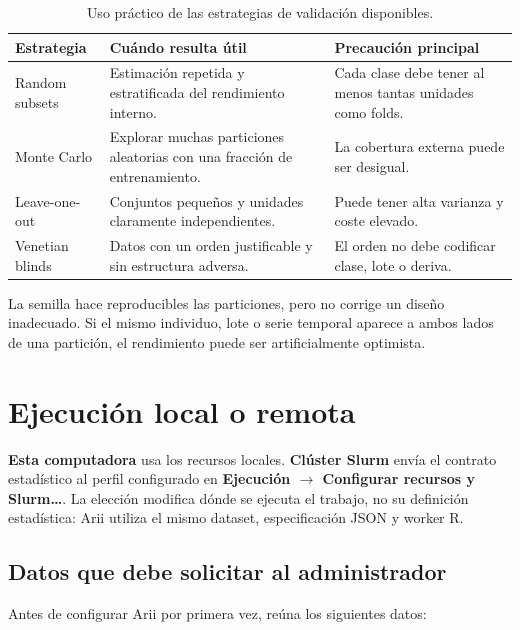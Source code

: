 \documentclass[11pt,a4paper,openany]{report}
\newcommand{\menu}[1]{\textbf{#1}}
\begin{document}
\begin{table}[H]
\centering
\small
\begin{tabularx}{\textwidth}{@{}p{}XX@{}}
\toprule
\textbf{Estrategia} & \textbf{Cuándo resulta útil} & \textbf{Precaución principal} \\
\midrule
Random subsets & Estimación repetida y estratificada del rendimiento interno. &
Cada clase debe tener al menos tantas unidades como folds. \\
Monte Carlo & Explorar muchas particiones aleatorias con una fracción de
entrenamiento. & La cobertura externa puede ser desigual. \\
Leave-one-out & Conjuntos pequeños y unidades claramente independientes. &
Puede tener alta varianza y coste elevado. \\
Venetian blinds & Datos con un orden justificable y sin estructura adversa. &
El orden no debe codificar clase, lote o deriva. \\
\bottomrule
\end{tabularx}
\caption{Uso práctico de las estrategias de validación disponibles.}
\end{table}

La semilla hace reproducibles las particiones, pero no corrige un diseño
inadecuado. Si el mismo individuo, lote o serie temporal aparece a ambos lados
de una partición, el rendimiento puede ser artificialmente optimista.

\section{Ejecución local o remota}

\menu{Esta computadora} usa los recursos locales. \menu{Clúster Slurm} envía el
contrato estadístico al perfil configurado en
\menu{Ejecución \texorpdfstring{$\rightarrow$}{ > } Configurar recursos y
Slurm…}. La elección modifica dónde se ejecuta el trabajo, no su definición
estadística: Arii utiliza el mismo dataset, especificación JSON y worker R.

\subsection{Datos que debe solicitar al administrador}

Antes de configurar Arii por primera vez, reúna los siguientes datos:
\end{document}
